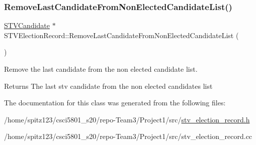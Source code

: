 \subsubsection{\texorpdfstring{Remove\+Last\+Candidate\+From\+Non\+Elected\+Candidate\+List()}{RemoveLastCandidateFromNonElectedCandidateList()}}
{\footnotesize\ttfamily \hyperlink{classSTVCandidate}{S\+T\+V\+Candidate} $\ast$ S\+T\+V\+Election\+Record\+::\+Remove\+Last\+Candidate\+From\+Non\+Elected\+Candidate\+List (\begin{DoxyParamCaption}{ }\end{DoxyParamCaption})}



Remove the last candidate from the non elected candidate list. 

\begin{DoxyReturn}{Returns}
The last stv candidate from the non elected candidates list 
\end{DoxyReturn}


The documentation for this class was generated from the following files\+:\begin{DoxyCompactItemize}
\item 
/home/spitz123/csci5801\+\_\+s20/repo-\/\+Team3/\+Project1/src/\hyperlink{stv__election__record_8h}{stv\+\_\+election\+\_\+record.\+h}\item 
/home/spitz123/csci5801\+\_\+s20/repo-\/\+Team3/\+Project1/src/stv\+\_\+election\+\_\+record.\+cc\end{DoxyCompactItemize}
